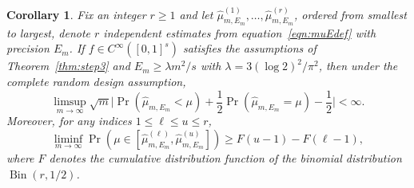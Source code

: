 \documentclass{article}
\newtheorem{corollary}{Corollary}
\theoremstyle{definition}
\renewcommand{\le}{\leqslant}
\renewcommand{\geq}{\geqslant}
\begin{document}
\begin{corollary}\label{cor:confint}
Fix an integer $r\geq 1$ and let $\hat{\mu}^{(1)}_{m,E_m}, \dots, \hat{\mu}^{(r)}_{m,E_m}$, ordered from smallest to largest,  denote $r$ independent estimates from equation~\eqref{eqn:muEdef} with precision $E_m$. If $f\in C^{\infty}([0,1]^s)$ satisfies the assumptions of Theorem~\ref{thm:step3} and $E_m\geq \lambda m^2/s$ with $\lambda=3(\log 2)^2/\pi^2$, then under the complete random design assumption,
\begin{equation}\label{eqn:muEmedian} 
\limsup_{m\to\infty} \sqrt{m}\Big|\Pr(\hat{\mu}_{m,E_m}<\mu)+\frac{1}{2}\Pr(\hat{\mu}_{m,E_m}=\mu)-\frac{1}{2}\Big|<\infty.
\end{equation}
    Moreover, for any indices $1\le \ell\le u\le r$,
    \begin{equation}\label{eqn:coverage}
        \liminf_{m\to\infty}\Pr(\mu\in [\hat{\mu}^{(\ell)}_{m,E_m},\hat{\mu}^{(u)}_{m,E_m}] )\geq F(u-1)-F(\ell-1),
    \end{equation}
    where $F$ denotes the cumulative distribution function of the binomial distribution $\operatorname{Bin}(r,1/2)$.
\end{corollary}
\end{document}
